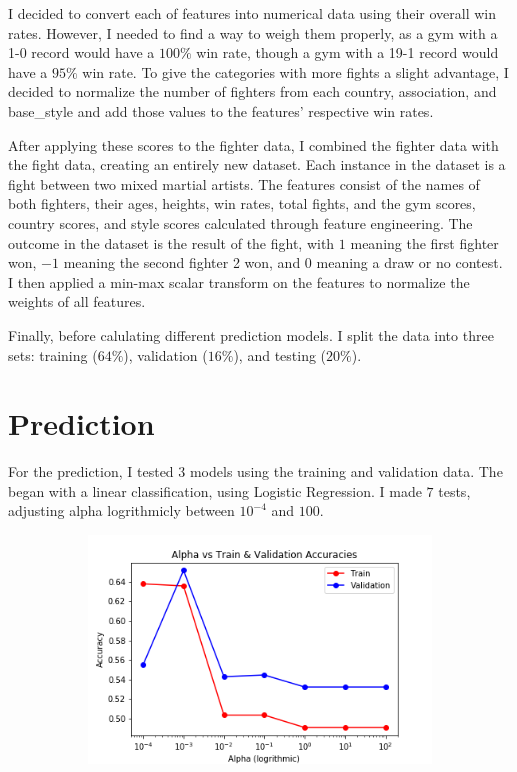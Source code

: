 \documentclass[12pt]{article}
\begin{document}
\begin{figure}[h!]
\begin{subfigure}{.5\textwidth}
  \label{fig:sub1}
\end{subfigure}%
\label{fig:test}
\end{figure}

I decided to convert each of features into numerical data using their overall win rates. However, I needed to find a way to weigh them properly, as a gym with a 1-0 record would have a $100\%$ win rate, though a gym with a 19-1 record would have a $95\%$ win rate. To give the categories with more fights a slight advantage, I decided to normalize the number of fighters from each country, association, and base\_style and add those values to the features' respective win rates.

After applying these scores to the fighter data, I combined the fighter data with the fight data, creating an entirely new dataset. Each instance in the dataset is a fight between two mixed martial artists. The features consist of the names of both fighters, their ages, heights, win rates, total fights, and the gym scores, country scores, and style scores calculated through feature engineering. The outcome in the dataset is the result of the fight, with $1$ meaning the first fighter won, $-1$ meaning the second fighter 2 won, and $0$ meaning a draw or no contest. I then applied a min-max scalar transform on the features to normalize the weights of all features.

Finally, before calulating different prediction models. I split the data into three sets: training ($64\%$), validation ($16\%$), and testing ($20\%$).


\section{Prediction}

For the prediction, I tested 3 models using the training and validation data. The began with a linear classification, using Logistic Regression. I made $7$ tests, adjusting alpha logrithmicly between $10^{-4}$ and $100$.

\begin{figure}[h!]
\centering
\begin{subfigure}{.5\textwidth}
  \centering
  \includegraphics[width=.88\linewidth]{logreg_plot.png}
  \label{fig:sub1}
\end{subfigure}%
\label{fig:test}
\end{figure}
\end{document}
